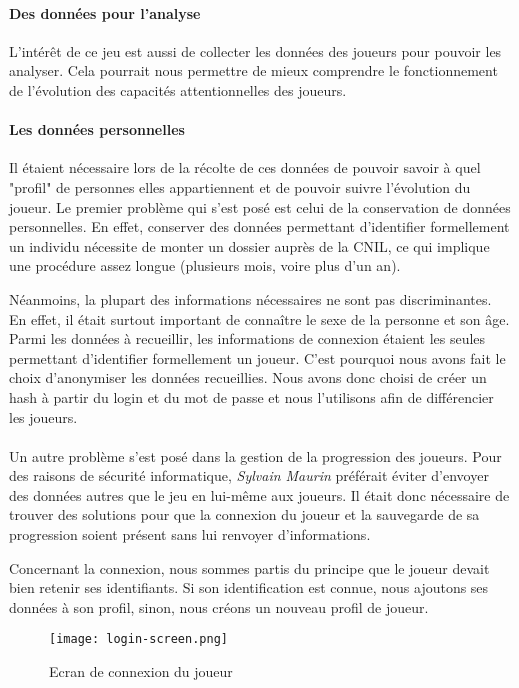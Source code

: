 \paragraph{Des données pour l'analyse}L'intérêt de ce jeu est aussi de collecter les données des joueurs pour pouvoir les analyser. Cela pourrait nous permettre de mieux comprendre le
fonctionnement de l'évolution des capacités attentionnelles des joueurs. 

\paragraph{Les données personnelles}Il étaient nécessaire lors de la récolte de ces données de pouvoir savoir à quel "profil" de personnes elles appartiennent et de pouvoir suivre
l'évolution du joueur. Le premier problème qui s'est posé est celui de la conservation de données personnelles. En effet, conserver des données permettant d'identifier formellement
un individu nécessite de monter un dossier auprès de la \gls{CNIL}, ce qui implique une procédure assez longue (plusieurs mois, voire plus d'un an). 

Néanmoins, la plupart des informations nécessaires ne sont pas discriminantes. En effet, il était surtout important de connaître le sexe de la personne et son âge. Parmi les données à
recueillir, les informations de connexion étaient les seules permettant d'identifier formellement un joueur. C'est pourquoi nous avons fait le choix d'anonymiser les données
recueillies. Nous avons donc choisi de créer un hash à partir du login et du mot de passe et nous l'utilisons afin de différencier les joueurs.

\paragraph{}Un autre problème s'est posé dans la gestion de la progression des joueurs. Pour des raisons de sécurité informatique, \emph{Sylvain Maurin} préférait éviter d'envoyer des
données autres que le jeu en lui-même aux joueurs. Il était donc nécessaire de trouver des solutions pour que la connexion du joueur et la sauvegarde de sa progression soient présent
sans lui renvoyer d'informations.

Concernant la connexion, nous sommes partis du principe que le joueur devait bien retenir ses identifiants. Si son identification est connue, nous ajoutons ses données à son profil,
sinon, nous créons un nouveau profil de joueur.

\begin{figure}[H]
    \begin{center}
    \texttt{[image: login-screen.png]}
    \end{center}
    \caption{Ecran de connexion du joueur}
\label{LoginScreen}
\end{figure}

